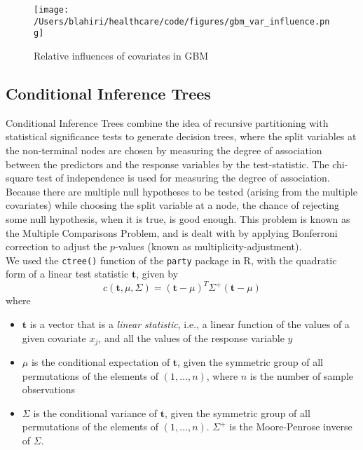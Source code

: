 \begin{figure}[!h]
    \centering
    \texttt{[image: /Users/blahiri/healthcare/code/figures/gbm\_var\_influence.png]}
    \caption{\small Relative influences of covariates in GBM}
    \label{fig:gbm_var_influence}
\end{figure}

\subsection{Conditional Inference Trees}
Conditional Inference Trees \cite{HHZ06} combine the idea of recursive partitioning with statistical significance tests to generate decision trees, where the split variables at the non-terminal nodes are chosen by measuring the degree of association between the predictors and the response variables by the test-statistic. The chi-square test of independence \cite{chi} is used for measuring the degree of association. Because there are multiple null hypotheses to be tested (arising from the multiple covariates) while choosing the split variable at a node, the chance of rejecting some null hypothesis, when it is true, is good enough. This problem is known as the Multiple Comparisons Problem, and is dealt with by applying Bonferroni correction to adjust the $p$-values (known as multiplicity-adjustment).\\

We used the \texttt{ctree()} function of the \texttt{party} package \cite{party} in R, with the quadratic form of a linear test statistic $\mathbf{t}$, given by \cite{HHZ06}
\begin{equation}
\label{eqn:quad_form}
c(\mathbf{t}, \mu, \Sigma) = (\mathbf{t} - \mu)^{T}{\Sigma}^+(\mathbf{t} - \mu)
\end{equation}
where 
\begin{itemize}
\item $\mathbf{t}$ is a vector that is a {\em linear statistic}, i.e., a linear function of the values of a given covariate $x_j$, and all the values of the response variable $y$
\item $\mu$ is the conditional expectation of $\mathbf{t}$, given the symmetric group of all permutations of the elements of $(1,\ldots,n)$, where $n$ is the number of sample observations
\item $\Sigma$ is the conditional variance of $\mathbf{t}$, given the symmetric group of all permutations of the elements of $(1,\ldots,n)$. ${\Sigma}^+$ is the Moore-Penrose inverse of $\Sigma$.
\end{itemize}

